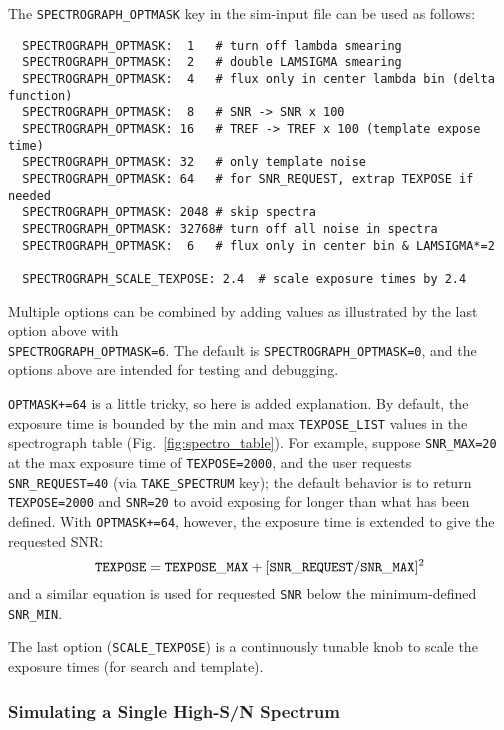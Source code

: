 \documentclass[12pt]{article}
\begin{document}
The {\tt SPECTROGRAPH\_OPTMASK} key in the sim-input file
can be used as follows:
%
\begin{verbatim}
  SPECTROGRAPH_OPTMASK:  1   # turn off lambda smearing
  SPECTROGRAPH_OPTMASK:  2   # double LAMSIGMA smearing
  SPECTROGRAPH_OPTMASK:  4   # flux only in center lambda bin (delta function)
  SPECTROGRAPH_OPTMASK:  8   # SNR -> SNR x 100
  SPECTROGRAPH_OPTMASK: 16   # TREF -> TREF x 100 (template expose time)
  SPECTROGRAPH_OPTMASK: 32   # only template noise
  SPECTROGRAPH_OPTMASK: 64   # for SNR_REQUEST, extrap TEXPOSE if needed
  SPECTROGRAPH_OPTMASK: 2048 # skip spectra
  SPECTROGRAPH_OPTMASK: 32768# turn off all noise in spectra
  SPECTROGRAPH_OPTMASK:  6   # flux only in center bin & LAMSIGMA*=2

  SPECTROGRAPH_SCALE_TEXPOSE: 2.4  # scale exposure times by 2.4
\end{verbatim}
%
Multiple options can be combined by adding values
as illustrated by the last option above with \\
{\tt SPECTROGRAPH\_OPTMASK=6}.
The default is {\tt SPECTROGRAPH\_OPTMASK=0},
and the options above are intended for testing and debugging.


{\tt OPTMASK+=64} is a little tricky, so here is added explanation.
By default, the exposure time is bounded by the min and max 
{\tt TEXPOSE\_LIST} values in the spectrograph table
(Fig.~\ref{fig:spectro_table}). For example, suppose {\tt SNR\_MAX=20}
at the max exposure time of {\tt TEXPOSE=2000}, and the user
requests {\tt SNR\_REQUEST=40} (via {\tt TAKE\_SPECTRUM} key);
the default behavior is to return {\tt TEXPOSE=2000} 
and {\tt SNR=20} to avoid exposing for longer than what has
been defined. With {\tt OPTMASK+=64}, however, the exposure
time is extended to give the requested SNR:
\begin{equation}
{\tt TEXPOSE} = {\tt TEXPOSE\_MAX} + [{\tt SNR\_REQUEST}/{\tt SNR\_MAX}]^2
\end{equation}
and a similar equation is used for requested {\tt SNR} below
the minimum-defined {\tt SNR\_MIN}.


The last option ({\tt SCALE\_TEXPOSE})
is a continuously tunable knob to scale
the exposure times (for search and template).

\subsubsection{Simulating a Single High-S/N Spectrum}
\label{sss:ONESPEC}
\end{document}
